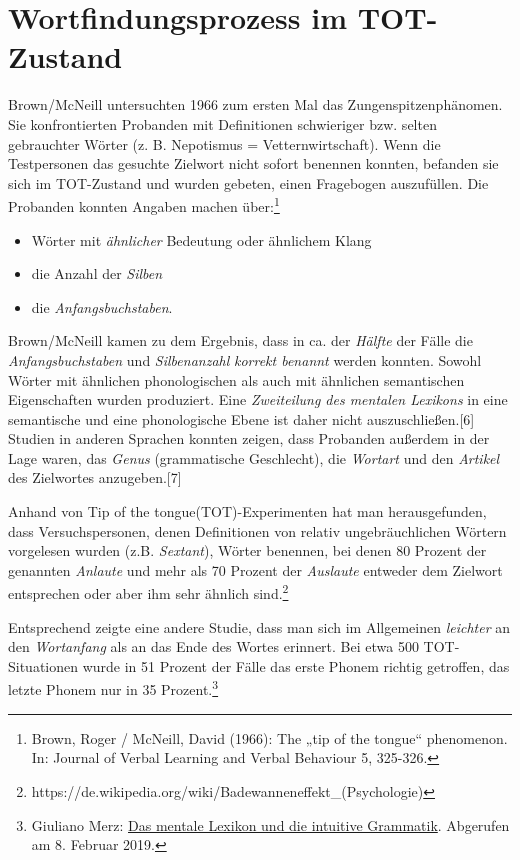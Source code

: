 \documentclass[
  letterpaper,
]{scrbook}
\providecommand{\tightlist}{%
  \setlength{\itemsep}{0pt}\setlength{\parskip}{0pt}}\usepackage{longtable,booktabs,array}
\begin{document}
\hypertarget{wortfindungsprozess-im-tot-zustand}{%
\section{Wortfindungsprozess im
TOT-Zustand}\label{wortfindungsprozess-im-tot-zustand}}

Brown/McNeill untersuchten 1966 zum ersten Mal das
Zungenspitzenphänomen. Sie konfrontierten Probanden mit Definitionen
schwieriger bzw. selten gebrauchter Wörter (z. B. Nepotismus =
Vetternwirtschaft). Wenn die Testpersonen das gesuchte Zielwort nicht
sofort benennen konnten, befanden sie sich im TOT-Zustand und wurden
gebeten, einen Fragebogen auszufüllen. Die Probanden konnten Angaben
machen über:\footnote{Brown, Roger / McNeill, David (1966): The „tip of
  the tongue`` phenomenon. In: Journal of Verbal Learning and Verbal
  Behaviour 5, 325-326.}

\begin{itemize}
\tightlist
\item
  Wörter mit \emph{ähnlicher} Bedeutung oder ähnlichem Klang\\
\item
  die Anzahl der \emph{Silben}\\
\item
  die \emph{Anfangsbuchstaben}.
\end{itemize}

Brown/McNeill kamen zu dem Ergebnis, dass in ca. der \emph{Hälfte} der
Fälle die \emph{Anfangsbuchstaben} und \emph{Silbenanzahl} \emph{korrekt
benannt} werden konnten. Sowohl Wörter mit ähnlichen phonologischen als
auch mit ähnlichen semantischen Eigenschaften wurden produziert. Eine
\emph{Zweiteilung des mentalen Lexikons} in eine semantische und eine
phonologische Ebene ist daher nicht auszuschließen.{[}6{]} Studien in
anderen Sprachen konnten zeigen, dass Probanden außerdem in der Lage
waren, das \emph{Genus} (grammatische Geschlecht), die \emph{Wortart}
und den \emph{Artikel} des Zielwortes anzugeben.{[}7{]}

Anhand von Tip of the tongue(TOT)-Experimenten hat man herausgefunden,
dass Versuchspersonen, denen Definitionen von relativ ungebräuchlichen
Wörtern vorgelesen wurden (z.B. \emph{Sextant}), Wörter benennen, bei
denen 80 Prozent der genannten \emph{Anlaute} und mehr als 70 Prozent
der \emph{Auslaute} entweder dem Zielwort entsprechen oder aber ihm sehr
ähnlich sind.\footnote{https://de.wikipedia.org/wiki/Badewanneneffekt\_(Psychologie)}

Entsprechend zeigte eine andere Studie, dass man sich im Allgemeinen
\emph{leichter} an den \emph{Wortanfang} als an das Ende des Wortes
erinnert. Bei etwa 500 TOT-Situationen wurde in 51 Prozent der Fälle das
erste Phonem richtig getroffen, das letzte Phonem nur in 35
Prozent.\footnote{Giuliano Merz:
  \href{http://www.a-ch-d.eu/materialien/WOERTERimKOPF/Merz-Paget-Pet\%C3\%B6_Handout.pdf}{Das
  mentale Lexikon und die intuitive Grammatik}. Abgerufen am 8. Februar
  2019.}
\end{document}
